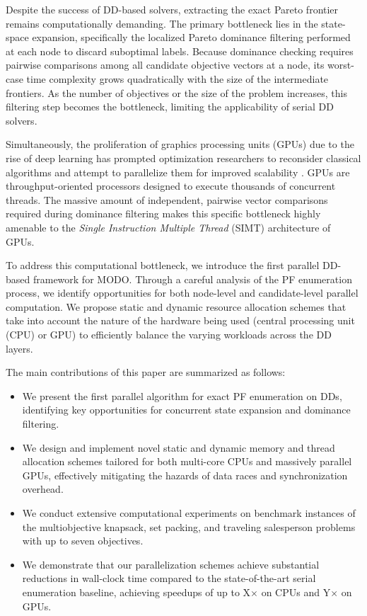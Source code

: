 \documentclass[letterpaper]{article}
\begin{document}
Despite the success of DD-based solvers, extracting the exact Pareto frontier remains computationally demanding. The primary bottleneck lies in the state-space expansion, specifically the localized Pareto dominance filtering performed at each node to discard suboptimal labels. Because dominance checking requires pairwise comparisons among all candidate objective vectors at a node, its worst-case time complexity grows quadratically with the size of the intermediate frontiers. As the number of objectives or the size of the problem increases, this filtering step becomes the bottleneck, limiting the applicability of serial DD solvers.

Simultaneously, the proliferation of graphics processing units (GPUs) due to the rise of deep learning has prompted optimization researchers to reconsider classical algorithms and attempt to parallelize them for improved scalability \cite{ben2019demystifying}. GPUs are throughput-oriented processors designed to execute thousands of concurrent threads. The massive amount of independent, pairwise vector comparisons required during dominance filtering makes this specific bottleneck highly amenable to the \emph{Single Instruction Multiple Thread} (SIMT) architecture of GPUs. 

To address this computational bottleneck, we introduce the first parallel DD-based framework for MODO. Through a careful analysis of the PF enumeration process, we identify opportunities for both node-level and candidate-level parallel computation. We propose static and dynamic resource allocation schemes that take into account the nature of the hardware being used (central processing unit (CPU) or GPU) to efficiently balance the varying workloads across the DD layers.

The main contributions of this paper are summarized as follows:
\begin{itemize}
    \item We present the first parallel algorithm for exact PF enumeration on DDs, identifying key opportunities for concurrent state expansion and dominance filtering.
    \item We design and implement novel static and dynamic memory and thread allocation schemes tailored for both multi-core CPUs and massively parallel GPUs, effectively mitigating the hazards of data races and synchronization overhead.
    \item We conduct extensive computational experiments on benchmark instances of the multiobjective knapsack, set packing, and traveling salesperson problems with up to seven objectives.
    \item We demonstrate that our parallelization schemes achieve substantial reductions in wall-clock time compared to the state-of-the-art serial enumeration baseline, achieving speedups of up to X$\times$ on CPUs and Y$\times$ on GPUs.
\end{itemize}
\end{document}
